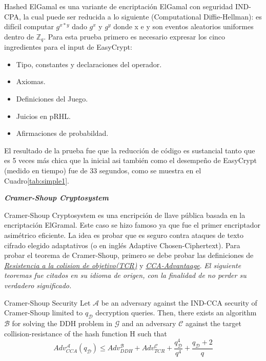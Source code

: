 \documentclass[runningheads,a4paper]{llncs}
\begin{document}
Hashed ElGamal es una variante de encriptación ElGamal con seguridad IND-CPA, la cual puede ser reducida a lo siguiente (Computational Diffie-Hellman): es difícil computar $g^{x*y}$ dado $g^x$ y $g^y$ donde x e y son eventos aleatorios uniformes dentro de $\mathbb{Z}_q$.
Para esta prueba primero es necesario expresar los cinco ingredientes para el input de EasyCrypt:
\begin{itemize}
	\item Tipo, constantes y declaraciones del operador.
	\item Axiomas.
	\item Definiciones del Juego.
	\item Juicios en pRHL.
	\item Afirmaciones de probabildad.
\end{itemize}

El resultado de la prueba fue que la reducción de código es sustancial tanto que es 5 veces más chica que la inicial asi también como el desempeño de EasyCrypt (medido en tiempo) fue de 33 segundos, como se muestra en el Cuadro\ref{tab:simple1}.\cite{article3}




\centerline{\textbf{{\emph{Cramer-Shoup Cryptosystem}}}}

Cramer-Shoup Cryptosystem es una encripción de llave pública basada en la encriptación ElGramal. Este caso se hizo famoso ya que fue el primer encriptador asimétrico eficiente. La idea es probar que es seguro contra ataques de texto cifrado elegido adaptativos (o en inglés Adaptive Chosen-Ciphertext).
Para probar el teorema de Cramer-Shoup, primero se debe probar las definiciones de \href{https://en.wikipedia.org/wiki/Collision_resistance}{\emph{Resistencia a la colision de objetivo(TCR)}} y \href{https://en.wikipedia.org/wiki/Advantage_(cryptography)}{\emph{CCA-Advantaage}}.
\emph{El siguiente teoremas fue citados en su idioma de origen, con la finalidad de no perder su verdadero significado.}

\begin{theorem}{Cramer-Shoup Security}
Let $\mathcal{A}$ be an adversary against the IND-CCA security
of Cramer-Shoup limited to $q_\mathcal{D}$ decryption queries. Then, there exists an algorithm $\mathcal{B}$ for solving the
DDH problem in $\mathcal{G}$ and an adversary $\mathcal{C}$ against the target collision-resistance of the hash function H
such that
\[Adv_{CCA}^\mathcal{A}(q_\mathcal{D}) \leq Adv_{DDH}^\mathcal{B} + Adv_{TCR}^\mathcal{C} + \frac{q_\mathcal{D}^4}{q^4} + \frac{q_\mathcal{D} + 2}{q}\]
\end{theorem}
\end{document}
